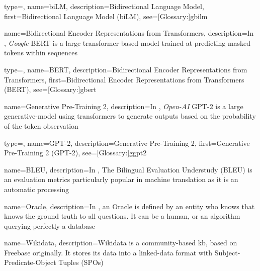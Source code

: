 {
  type=\acronymtype,
  name={biLM},
  description={Bidirectional Language Model},
  first={Bidirectional Language Model (biLM)},
  see=[Glossary:]{gbilm}
}

{
  name={Bidirectional Encoder Representations from Transformers},
  description={In , \textit{Google} BERT is a large \gls{transformer}-based model trained at predicting masked tokens within sequences}
}

{
  type=\acronymtype,
  name={BERT},
  description={Bidirectional Encoder Representations from Transformers},
  first={Bidirectional Encoder Representations from Transformers (BERT)},
  see=[Glossary:]{gbert}
}


{
  name={Generative Pre-Training 2},
  description={In , \textit{Open-AI} GPT-2 is a large \gls{generative-model} using \glspl{transformer} to generate outputs based on the probability of the token observation}
}

{
  type=\acronymtype,
  name={GPT-2},
  description={Generative Pre-Training 2},
  first={Generative Pre-Training 2 (GPT-2)},
  see=[Glossary:]{ggpt2}
}


{
  name={BLEU},
  description={In , The Bilingual Evaluation Understudy (BLEU) is an evaluation metrics particularly popular in machine translation as it is an automatic processing}
}

{
  name={Oracle},
  description={In , an Oracle is defined by an entity who knows that knows the ground truth to all questions. It can be a human, or an algorithm querying perfectly a database}
}

{
  name={Wikidata},
  description={Wikidata is a community-based \gls{kb}, based on Freebase originally. It stores its data into a linked-data format with Subject-Predicate-Object Tuples (SPOs)}
}




